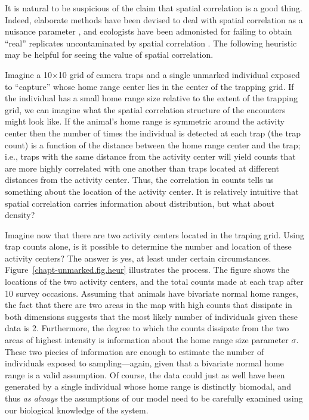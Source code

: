 It is natural to be suspicious of the claim that spatial correlation
is a good thing. Indeed, elaborate methods have been devised to deal
with spatial correlation as a nuisance parameter
\citep{lichstein_etal:2002,dormann_etal:2007}, and ecologists have been admonisted for
failing to obtain ``real'' replicates uncontaminated by spatial
correlation \citep{hurlbert:1984}. The following heuristic may be
helpful for seeing the value of spatial correlation.

Imagine a 10$\times$10 grid of camera traps and a single unmarked
individual exposed to ``capture'' whose home range center lies in the center of the
trapping grid. If the individual has a small home range size relative
to the extent of the trapping grid, we can imagine what the
spatial correlation structure of the encounters might look
like. If the animal's home range is symmetric around the activity center
then the number of times the individual is detected at each
trap (the trap count) is a function of the distance between the home
range center and the trap; i.e., traps with the same distance
from the activity center will yield counts that are more highly
correlated with one another than traps located at different distances
from the activity center. Thus, the correlation in counts tells us
something about the location of the activity center. It is relatively
intuitive that spatial correlation carries information about
distribution, but what about density?


Imagine now that there are two activity centers located in the traping
grid. Using trap counts alone, %
is it possible to determine the number and location of these activity
centers? The answer is yes, at least under certain circumstances.
Figure~\ref{chapt-unmarked.fig.heur} illustrates the process. The
figure shows the locations of the two activity centers, and the total
counts made at each trap after 10 survey occasions.
Assuming that animals have bivariate normal home
ranges, the fact that there are two areas in the map with high counts
that dissipate in both dimensions suggests that the most likely number of
individuals given these data is 2. Furthermore, the degree to which
the counts dissipate from the two areas of highest intensity is
information about the home range size parameter $\sigma$. These two
piecies of information are enough to estimate the number of
individuals exposed to sampling---again, given
that a bivariate normal home range is a valid assumption. Of course,
the data could just as well have been generated by a single individual
whose home range is distinctly biomodal, and thus \textit{as always}
the assumptions of our model need to be carefully examined using our
biological knowledge of the system.

